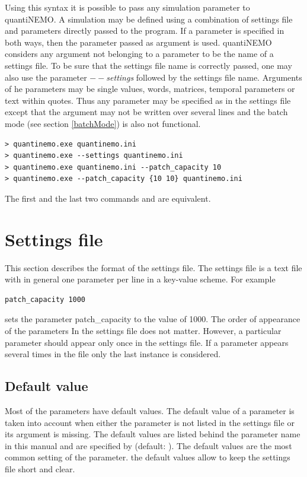 \documentclass[letterpaper,12pt,oneside]{book}
\begin{document}
\begin{description}
Using this syntax it is possible to pass any simulation parameter to quantiNEMO. A simulation may be defined using a combination of settings file and parameters directly passed to the program. If a parameter is specified in both ways, then the parameter passed as argument is used. quantiNEMO considers any argument not belonging to a parameter to be the name of a settings file. To be sure that the settings file name is correctly passed, one may also use the parameter \textit{$--$settings} followed by the settings file name. Arguments of he parameters may be single values, words, matrices, temporal parameters or text within quotes. Thus any parameter may be specified as in the settings file except that the argument may not be written over several lines and the batch mode (see section \ref{batchMode}) is also not functional. 

\begin{lstlisting}[frame=single]
> quantinemo.exe quantinemo.ini
> quantinemo.exe --settings quantinemo.ini
> quantinemo.exe quantinemo.ini --patch_capacity 10
> quantinemo.exe --patch_capacity {10 10} quantinemo.ini 
\end{lstlisting}
The first and the last two commands and are equivalent.
\end{description}



\newpage
\chapter{Settings file}\label{input}
This section describes the format of the settings file. The settings file is a text file with in general one parameter per line in a key-value scheme. For example
\begin{lstlisting}[frame=single]
patch_capacity 1000
\end{lstlisting}
sets the parameter \textsf{patch\_capacity} to the value of 1000. The order of appearance of the parameters In the settings file does not matter. However, a particular parameter should appear only once in the settings file. If a parameter appears several times in the file only the last instance is considered. 

\section{Default value}
Most of the parameters have default values. The default value of a parameter is taken into account when either the parameter is not listed in the settings file or its argument is missing. The default values are listed behind the parameter name in this manual and are specified by \textsf{(default: )}. The default values are the most common setting of the parameter. the default values allow to keep the settings file short and clear.  
\end{document}
